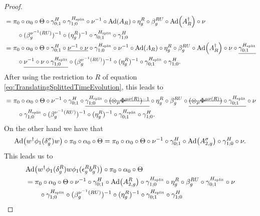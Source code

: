 \documentclass[12pt,a4paper,twoside]{article}
\numberwithin{equation}{section}
\begin{document}
\begin{proof}
\begin{align}
		&=\pi_0\circ\alpha_0\circ\Theta\circ\gamma^H_{0;1}\circ\gamma^{H_{\text{split}}}_{1;0}\circ\nu^{-1}\circ\Ad{A_R}\circ\eta_g^R\circ\beta_g^{RU}\circ\Ad{A_R^\dagger}\circ\nu\\
		\nonumber
		&\qquad\circ(\beta_g^{\nu^{-1}(RU)})^{-1}\circ(\eta_g^R)^{-1}\circ\gamma^{H_{\text{split}}}_{0;1}\circ\gamma^{H}_{1;0}\\
		&=\pi_0\circ\alpha_0\circ\Theta\circ\gamma^H_{0;1}\circ\underline{\nu^{-1}\circ\nu}\circ\gamma^{H_{\text{split}}}_{1;0}\circ\nu^{-1}\circ\Ad{A_R}\circ\eta_g^R\circ\beta_g^{RU}\circ\Ad{A_R^\dagger}\circ\nu\circ\underline{\gamma^{H_\text{split}}_{0;1}}\\
		\nonumber
		&\qquad \circ\underline{\nu^{-1}\circ\nu\circ\gamma^{H_{\text{split}}}_{1;0}}\circ(\beta_g^{\nu^{-1}(RU)})^{-1}\circ(\eta_g^R)^{-1}\circ\gamma^{H_{\text{split}}}_{0;1}\circ\gamma^{H}_{1;0}.
	\end{align}
After using the restriction to $R$ of equation \eqref{eq:TranslatingSplittedTimeEvolution}, this leads to
	\begin{align}
		&=\pi_0\circ\alpha_0\circ\Theta\circ\nu^{-1}\circ\gamma^H_{0;1}\circ\underline{\gamma^{H_{\text{split}}}_{1;0}\circ\stkout{(\otimes_\mu\Phi^{\mu\nu(R)})^{-1}}}\circ\eta_g^R\circ\beta_g^{RU}\circ\underline{\stkout{(\otimes_\mu\Phi^{\mu\nu(R)})}\circ\gamma^{H_\text{split}}_{0;1}}\circ\nu\\
		\nonumber
		&\qquad \circ\gamma^{H_\text{split}}_{1;0}\circ(\beta_g^{\nu^{-1}(RU)})^{-1}\circ(\eta_g^R)^{-1}\circ\gamma^{H_{\text{split}}}_{0;1}\circ\gamma^{H}_{1;0}.
	\end{align}
	On the other hand we have that
	\begin{equation}
		\Ad{w^\dagger \phi_1(\delta_g^\sigma)w}\circ\pi_0\circ\alpha_0\circ\Theta=\pi_0\circ\alpha_0\circ\Theta\circ\nu^{-1}\circ\gamma^H_{0;1}\circ\Ad{A^\sigma_{2,g}}\circ\gamma^H_{1;0}\circ\nu.
	\end{equation}
	This leads us to
	\begin{align}
		&\Ad{w^\dagger\phi_1(\delta_g^R)w\phi_1(\epsilon_g^R b_g^R)}\circ\pi_0\circ\alpha_0\circ\Theta\\
		&=\pi_0\circ\alpha_0\circ\Theta\circ\nu^{-1}\circ\gamma^H_{0;1}\circ\Ad{A_{2,g}^R}\circ\gamma^{H_{\text{split}}}_{1;0}\circ\eta_g^R\circ\beta_g^{RU}\circ\gamma^{H_\text{split}}_{0;1}\circ\nu\\
		\nonumber
		&\qquad \circ\gamma^{H_\text{split}}_{1;0}\circ(\beta_g^{\nu^{-1}(RU)})^{-1}\circ(\eta_g^R)^{-1}\circ\gamma^{H_{\text{split}}}_{0;1}\circ\gamma^{H}_{1;0}\\

\end{align}
\end{proof}
\end{document}
